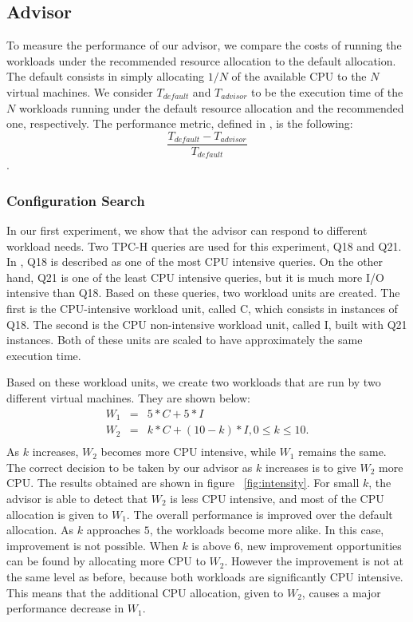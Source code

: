 \documentclass[jidm,a4paper]{jidm} %
\begin{document}
\subsection{Advisor}
 

 
 To measure the performance of our advisor, we compare the costs of running the workloads under the recommended resource allocation to the default allocation. The default consists in simply allocating $1/N$ of the available CPU to the $N$ virtual machines. We consider $T_{default}$ and $T_{advisor}$ to be the execution time of the $N$ workloads running under the default resource allocation and the recommended one, respectively. The performance metric, defined in \cite{Soror:2008:AVM:1376616.1376711}, is the following:
 \[
  \frac{T_{default}-T_{advisor}}{T_{default}}
 \]
.
\subsubsection{Configuration Search}

In our first experiment, we show that the advisor can respond to different workload needs. Two TPC-H queries are used for this experiment, Q18 and Q21. In \cite{Soror:2008:AVM:1376616.1376711}, Q18 is described as one of the most CPU intensive queries. On the other hand, Q21 is one of the least CPU intensive queries, but it is much more I/O intensive than Q18. Based on these queries, two workload units are created. The first is the CPU-intensive workload unit, called C, which consists in instances of Q18. The second is the CPU non-intensive workload unit, called I, built with Q21 instances. Both of these units are scaled to have approximately the same execution time.

Based on these workload units, we create two workloads that are run by two different virtual machines. They are shown below:
\begin{eqnarray*}
 W_{1} &=& 5*C + 5*I \\
 W_{2} &=& k*C + (10-k)*I, 0 \leq k \leq 10. \\
\end{eqnarray*}
As $k$ increases, $W_{2}$ becomes more CPU intensive, while $W_{1}$ remains the same. The correct decision to be taken by our advisor as $k$ increases is to give $W_{2}$ more CPU. The results obtained are shown in figure ~\ref{fig:intensity}. For small $k$, the advisor is able to detect that $W_{2}$ is less CPU intensive, and most of the CPU allocation is given to $W_{1}$. The overall performance is improved  over the default allocation. As $k$ approaches $5$, the workloads become more alike. In this case, improvement is not possible. When $k$ is above $6$, new improvement  opportunities can be found by allocating more CPU to $W_{2}$. However the improvement is not at the same level as before, because both workloads are significantly CPU intensive. This means that the additional CPU allocation, given to $W_{2}$, causes a major performance decrease in $W_{1}$.
\end{document}
